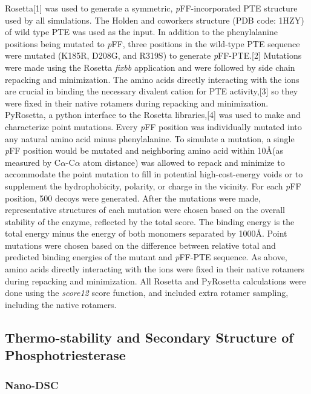 \begin{refsection}
Rosetta[1] was used to generate a symmetric, \emph{p}FF-incorporated PTE
structure used by all simulations. The Holden and coworkers structure (PDB
code: 1HZY) of wild type PTE was used as the input. In addition to the
phenylalanine positions being mutated to \emph{p}FF, three positions in the
wild-type PTE sequence were mutated (K185R, D208G, and R319S) to generate
\emph{p}FF-PTE.[2] Mutations were made using the Rosetta \emph{fixbb}
application and were followed by side chain repacking and minimization. The
amino acids directly interacting with the  ions are crucial in
binding the necessary divalent cation for PTE activity,[3] so they were fixed
in their native rotamers during repacking and minimization. PyRosetta, a python
interface to the Rosetta libraries,[4] was used to make and characterize point
mutations. Every \emph{p}FF position was individually mutated into any natural
amino acid minus phenylalanine. To simulate a mutation, a single \emph{p}FF
position would be mutated and neighboring amino acid within 10\AA (as measured
by C$\alpha$-C$\alpha$ atom distance) was allowed to repack and minimize to
accommodate the point mutation to fill in potential high-cost-energy voids or
to supplement the hydrophobicity, polarity, or charge in the vicinity. For each
\emph{p}FF position, 500 decoys were generated. After the mutations were made,
representative structures of each mutation were chosen based on the overall
stability of the enzyme, reflected by the total score. The binding energy is
the total energy minus the energy of both monomers separated by 1000\AA. Point
mutations were chosen based on the difference between relative total and
predicted binding energies of the mutant and \emph{p}FF-PTE sequence. As above,
amino acids directly interacting with the  ions were fixed in their
native rotamers during repacking and minimization. All Rosetta and PyRosetta
calculations were done using the \emph{score12} score function, and included
extra rotamer sampling, including the native rotamers.

\subsection{Thermo-stability and Secondary Structure of Phosphotriesterase}
\label{sec:thermo}

\subsubsection{Nano-DSC}
\label{sec:dsc}


\end{refsection}
